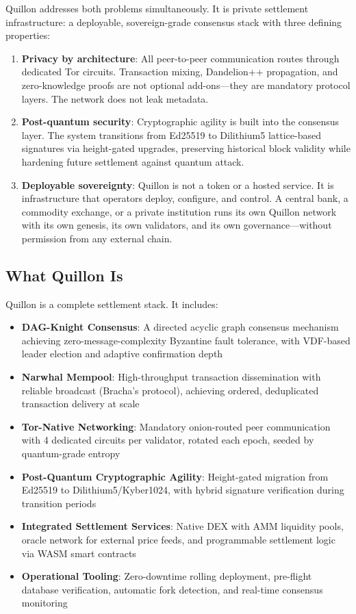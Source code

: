 \documentclass[11pt,a4paper]{article}
\begin{document}
Quillon addresses both problems simultaneously. It is private settlement infrastructure: a deployable, sovereign-grade consensus stack with three defining properties:

\begin{enumerate}
    \item \textbf{Privacy by architecture}: All peer-to-peer communication routes through dedicated Tor circuits. Transaction mixing, Dandelion++ propagation, and zero-knowledge proofs are not optional add-ons---they are mandatory protocol layers. The network does not leak metadata.
    \item \textbf{Post-quantum security}: Cryptographic agility is built into the consensus layer. The system transitions from Ed25519 to Dilithium5 lattice-based signatures via height-gated upgrades, preserving historical block validity while hardening future settlement against quantum attack.
    \item \textbf{Deployable sovereignty}: Quillon is not a token or a hosted service. It is infrastructure that operators deploy, configure, and control. A central bank, a commodity exchange, or a private institution runs its own Quillon network with its own genesis, its own validators, and its own governance---without permission from any external chain.
\end{enumerate}

\subsection{What Quillon Is}

Quillon is a complete settlement stack. It includes:

\begin{itemize}
    \item \textbf{DAG-Knight Consensus}: A directed acyclic graph consensus mechanism achieving zero-message-complexity Byzantine fault tolerance, with VDF-based leader election and adaptive confirmation depth
    \item \textbf{Narwhal Mempool}: High-throughput transaction dissemination with reliable broadcast (Bracha's protocol), achieving ordered, deduplicated transaction delivery at scale
    \item \textbf{Tor-Native Networking}: Mandatory onion-routed peer communication with 4 dedicated circuits per validator, rotated each epoch, seeded by quantum-grade entropy
    \item \textbf{Post-Quantum Cryptographic Agility}: Height-gated migration from Ed25519 to Dilithium5/Kyber1024, with hybrid signature verification during transition periods
    \item \textbf{Integrated Settlement Services}: Native DEX with AMM liquidity pools, oracle network for external price feeds, and programmable settlement logic via WASM smart contracts
    \item \textbf{Operational Tooling}: Zero-downtime rolling deployment, pre-flight database verification, automatic fork detection, and real-time consensus monitoring
\end{itemize}
\end{document}
